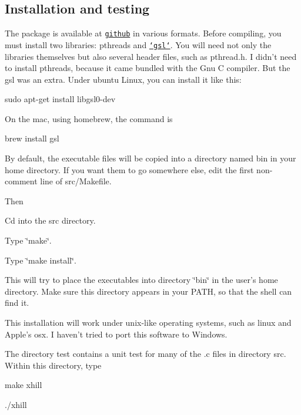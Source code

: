 \subsection*{Installation and testing}

The package is available at \href{github.com/alanrogers/ldpsiz}{\tt github} in various formats. Before compiling, you must install two libraries\-: {\ttfamily pthreads} and \href{http://www.gnu.org/software/gsl}{\tt `gsl`}. You will need not only the libraries themselves but also several header files, such as {\ttfamily pthread.\-h}. I didn't need to install {\ttfamily pthreads}, because it came bundled with the Gnu C compiler. But the gsl was an extra. Under ubuntu Linux, you can install it like this\-: \begin{DoxyVerb}sudo apt-get install libgsl0-dev
\end{DoxyVerb}


On the mac, using homebrew, the command is \begin{DoxyVerb}brew install gsl
\end{DoxyVerb}


By default, the executable files will be copied into a directory named {\ttfamily bin} in your home directory. If you want them to go somewhere else, edit the first non-\/comment line of src/\-Makefile.

Then


\begin{DoxyEnumerate}
\item Cd into the src directory.
\item Type \char`\"{}make\char`\"{}.
\item Type \char`\"{}make install\char`\"{}.
\end{DoxyEnumerate}

This will try to place the executables into directory \char`\"{}bin\char`\"{} in the user's home directory. Make sure this directory appears in your P\-A\-T\-H, so that the shell can find it.

This installation will work under unix-\/like operating systems, such as linux and Apple's osx. I haven't tried to port this software to Windows.

The directory {\ttfamily test} contains a unit test for many of the .c files in directory {\ttfamily src}. Within this directory, type


\begin{DoxyEnumerate}
\item make xhill
\item ./xhill
\end{DoxyEnumerate}

